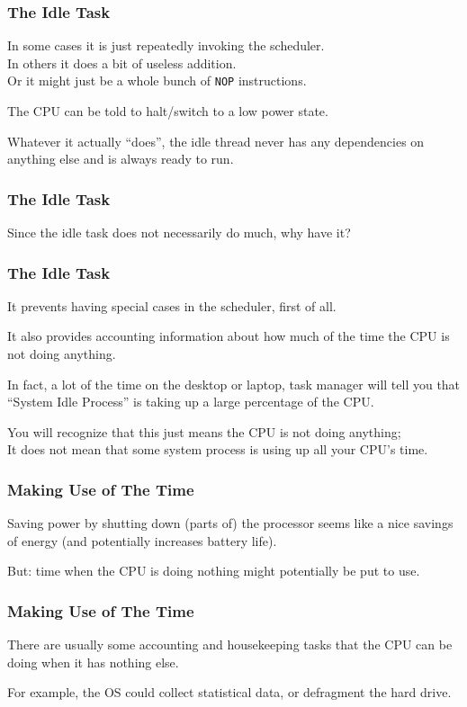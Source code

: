 \begin{frame}
\frametitle{The Idle Task}

In some cases it is just repeatedly invoking the scheduler.\\
\quad In others it does a bit of useless addition.\\
\quad Or it might just be a whole bunch of \texttt{NOP} instructions. 

The CPU can be told to halt/switch to a low power state. 

Whatever it actually ``does'', the idle thread never has any dependencies on anything else and is always ready to run.

\end{frame}

\begin{frame}
\frametitle{The Idle Task}

Since the idle task does not necessarily do much, why have it? 

\end{frame}

\begin{frame}
\frametitle{The Idle Task}

It prevents having special cases in the scheduler, first of all. 

It also provides accounting information about how much of the time the CPU is not doing anything. 

In fact, a lot of the time on the desktop or laptop, task manager will tell you that ``System Idle Process'' is taking up a large percentage of the CPU. 

You will recognize that this just means the CPU is not doing anything;\\
\quad It does not mean that some system process is using up all your CPU's time.


\end{frame}

\begin{frame}
\frametitle{Making Use of The Time}

Saving power by shutting down (parts of) the processor seems like a nice savings of energy (and potentially increases battery life). 

But: time when the CPU is doing nothing might potentially be put to use.

\end{frame}

\begin{frame}
\frametitle{Making Use of The Time}


There are usually some accounting and housekeeping tasks that the CPU can be doing when it has nothing else. 
 
For example, the OS could collect statistical data, or defragment the hard drive.


\end{frame}

